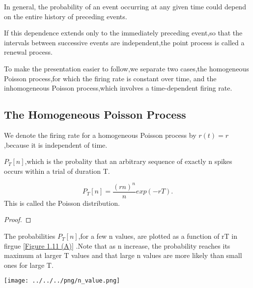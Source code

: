 \begin{defn}
    In general, the probability of an event occurring at any given time could depend on the entire history of preceding events. 
\end{defn}

\begin{defn}
    If this dependence extends only to the immediately preceding event,so that the intervals between successive events are independent,the point process is called a renewal process.
\end{defn}


\begin{defn}
    To make the presentation easier to follow,we separate two cases,the homogeneous Poisson process,for which the firing rate is constant over time, and the inhomogeneous Poisson process,which involves a time-dependent firing rate.
\end{defn}

\subsection{The Homogeneous Poisson Process}

\begin{defn}
    We denote the firing rate for a homogeneous Poisson process by $r(t)=r$,because it is independent of time.
\end{defn}

\begin{defn}
    $P_T[n]$,which is the probality that an arbitrary sequence of exactly n spikes occurs within a trial of duration T.    
\end{defn}

\begin{thm}
    \begin{equation}
        P_T[n]=\frac{(rn)^n}{n}exp(-rT).
    \end{equation}
    This is called the Poisson distribution.
    \begin{proof}
    \end{proof}
\end{thm}

\begin{exm}
    The probabilities $P_T[n]$,for a few n values, are plotted as a function of rT in  firgue \ref{Figure 1.11 (A)} .Note that as n increase, the probability reaches its maximum at larger T values and that large n values are more likely than small ones for large T.
\end{exm}    
\begin{center}
    \label{Figure 1.11 (A)}    
    \texttt{[image: ../../../png/n\_value.png]}    \\
\end{center}


